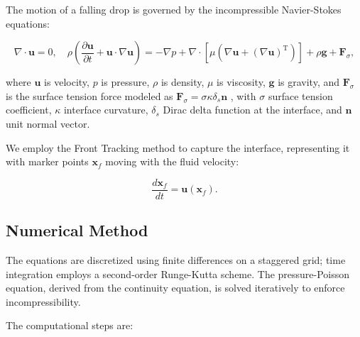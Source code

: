 \documentclass[12pt]{article}
\begin{document}
The motion of a falling drop is governed by the incompressible Navier-Stokes equations:

\begin{equation}
    \nabla \cdot \mathbf{u} = 0, \quad
    \rho \left( \frac{\partial \mathbf{u}}{\partial t} + \mathbf{u} \cdot \nabla \mathbf{u} \right ) = -\nabla p + \nabla \cdot \left[ \mu \left( \nabla \mathbf{u} + (\nabla \mathbf{u})^\mathrm{T} \right) \right] + \rho \mathbf{g} + \mathbf{F}_\sigma,
    \label{eq:navier_stokes}
\end{equation}

where $\mathbf{u}$ is velocity, $p$ is pressure, $\rho$ is density, $\mu$ is viscosity, $\mathbf{g}$ is gravity, and $\mathbf{F}_\sigma$ is the surface tension force modeled as $\mathbf{F}_\sigma = \sigma \kappa \delta_s \mathbf{n}$ \cite{brackbill1992continuum}, with $\sigma$ surface tension coefficient, $\kappa$ interface curvature, $\delta_s$ Dirac delta function at the interface, and $\mathbf{n}$ unit normal vector.

We employ the Front Tracking method \cite{tryggvason2011multiphase} to capture the interface, representing it with marker points $\mathbf{x}_f$ moving with the fluid velocity:

\begin{equation}
    \frac{d \mathbf{x}_f}{d t} = \mathbf{u}(\mathbf{x}_f).
    \label{eq:front_tracking}
\end{equation}

\subsection{Numerical Method}

The equations are discretized using finite differences on a staggered grid; time integration employs a second-order Runge-Kutta scheme. The pressure-Poisson equation, derived from the continuity equation, is solved iteratively to enforce incompressibility.

The computational steps are:
\end{document}
